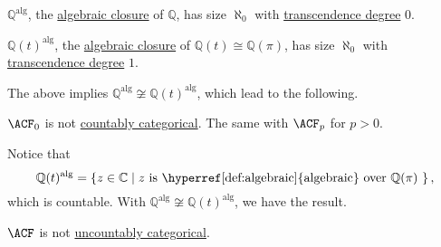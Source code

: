 \begin{eg}
	\(\mathbb{Q} ^\text{alg} \), the \hyperref[def:algebraic-closure]{algebraic closure} of \(\mathbb{Q} \), has size \(\aleph_0\) with \hyperref[def:transcendence-degree]{transcendence degree} \(0\).
\end{eg}

\begin{eg}
	\(\mathbb{Q} (t)^\text{alg} \), the \hyperref[def:algebraic-closure]{algebraic closure} of \(\mathbb{Q} (t) \cong \mathbb{Q} (\pi )\), has size \(\aleph_0\) with \hyperref[def:transcendence-degree]{transcendence degree} \(1\).
\end{eg}

The above implies \(\mathbb{Q}^{\text{alg} }\not \cong \mathbb{Q}(t)^{\text{alg} } \), which lead to the following.

\begin{remark}
	\(\ACF_0\) is not \hyperref[def:countably-categorical]{countably categorical}. The same with \(\ACF_p\) for \(p>0\).
\end{remark}
\begin{explanation}
	Notice that
	\[
		\mathbb{Q} (t)^{\text{alg} } = \left\{ z\in \mathbb{C} \mid \text{\(z\) is \hyperref[def:algebraic]{algebraic} over \(\mathbb{Q} (\pi )\) }  \right\},
	\]
	which is countable. With \(\mathbb{Q}^{\text{alg} }\not \cong \mathbb{Q}(t)^{\text{alg} } \), we have the result.
\end{explanation}

\begin{note}
	\(\ACF\) is not \hyperref[def:uncountably-categorical]{uncountably categorical}.
\end{note}

